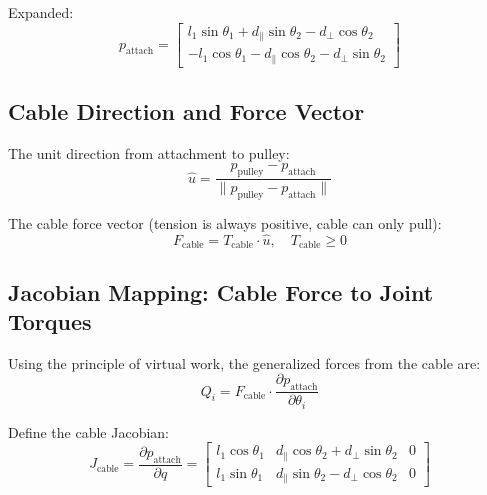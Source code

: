 \documentclass[11pt,a4paper]{article}
\newcommand{\vc}[1]{\bm{#1}}
\newcommand{\pder}[2]{\frac{\partial #1}{\partial #2}}
\def\vc#1{#1}%
\def\bm#1{#1}%
\begin{document}
Expanded:
\begin{equation}
    \vc{p}_{\text{attach}} = \begin{bmatrix}
        l_1 \sin\theta_1 + d_{\parallel}\sin\theta_2 - d_{\perp}\cos\theta_2 \\
        -l_1 \cos\theta_1 - d_{\parallel}\cos\theta_2 - d_{\perp}\sin\theta_2
    \end{bmatrix}
    \label{eq:cable_attach_expanded}
\end{equation}

\subsection{Cable Direction and Force Vector}

The unit direction from attachment to pulley:
\begin{equation}
    \hat{\vc{u}} = \frac{\vc{p}_{\text{pulley}} - \vc{p}_{\text{attach}}}
                        {\|\vc{p}_{\text{pulley}} - \vc{p}_{\text{attach}}\|}
    \label{eq:cable_direction}
\end{equation}

The cable force vector (tension is always positive, cable can only pull):
\begin{equation}
    \vc{F}_{\text{cable}} = T_{\text{cable}} \cdot \hat{\vc{u}}, \quad T_{\text{cable}} \geq 0
    \label{eq:cable_force}
\end{equation}

\subsection{Jacobian Mapping: Cable Force to Joint Torques}

Using the principle of virtual work, the generalized forces from the cable are:
\begin{equation}
    Q_i = \vc{F}_{\text{cable}} \cdot \pder{\vc{p}_{\text{attach}}}{\theta_i}
    \label{eq:virtual_work}
\end{equation}

Define the cable Jacobian:
\begin{equation}
    \vc{J}_{\text{cable}} = \pder{\vc{p}_{\text{attach}}}{\vc{q}}
    = \begin{bmatrix}
        l_1 \cos\theta_1 & d_{\parallel}\cos\theta_2 + d_{\perp}\sin\theta_2 & 0 \\
        l_1 \sin\theta_1 & d_{\parallel}\sin\theta_2 - d_{\perp}\cos\theta_2 & 0
    \end{bmatrix}
    \label{eq:cable_jacobian}
\end{equation}
\end{document}
